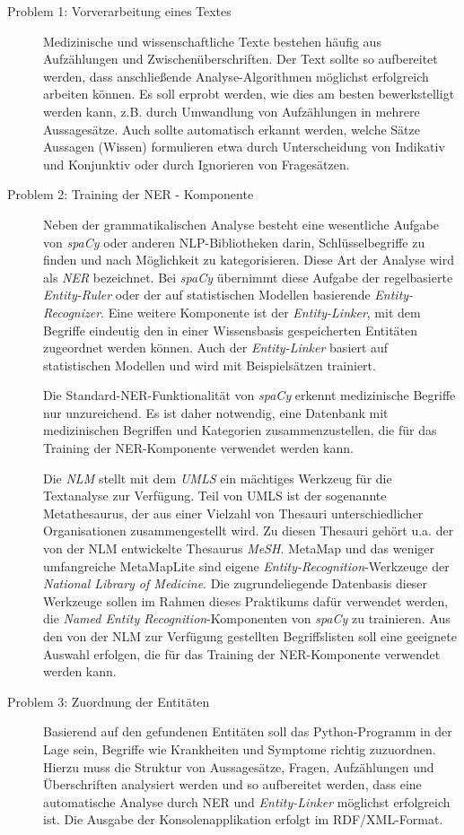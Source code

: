 \begin{description}

\item[Problem 1: Vorverarbeitung eines Textes] Medizinische und wissenschaftliche Texte bestehen häufig aus Aufzählungen und Zwischenüberschriften. Der Text sollte so aufbereitet werden, dass anschließende Analyse-Algorithmen möglichst erfolgreich arbeiten können. Es soll erprobt werden, wie dies am besten bewerkstelligt werden kann, z.B. durch Umwandlung von Aufzählungen in mehrere Aussagesätze. Auch sollte automatisch erkannt werden, welche Sätze Aussagen (Wissen) formulieren etwa durch Unterscheidung von Indikativ und Konjunktiv oder durch Ignorieren von Fragesätzen. 

\item[Problem 2: Training der NER - Komponente] Neben der grammatikalischen Analyse besteht eine wesentliche Aufgabe von \emph{spaCy} oder anderen NLP-Bibliotheken darin, Schlüsselbegriffe zu finden und nach Möglichkeit zu kategorisieren. Diese Art der Analyse wird als \emph{\ac{NER}} bezeichnet. Bei \emph{spaCy} übernimmt diese Aufgabe der regelbasierte \emph{Entity-Ruler} oder der auf statistischen Modellen basierende \emph{Entity-Recognizer}. Eine weitere Komponente ist der \emph{Entity-Linker}, mit dem Begriffe eindeutig den in einer Wissensbasis gespeicherten Entitäten zugeordnet werden können. Auch der \emph{Entity-Linker} basiert auf statistischen Modellen und wird mit Beispielsätzen trainiert.

Die Standard-NER-Funktionalität von \emph{spaCy} erkennt medizinische Begriffe nur unzureichend. Es ist daher notwendig, eine Datenbank mit medizinischen Begriffen und Kategorien zusammenzustellen, die für das Training der NER-Komponente verwendet werden kann.

Die \emph{\ac{NLM}} stellt mit dem \emph{\ac{UMLS}} ein mächtiges Werkzeug für die Textanalyse zur Verfügung. Teil von UMLS ist der sogenannte Metathesaurus, der aus einer Vielzahl von Thesauri unterschiedlicher Organisationen zusammengestellt wird. Zu diesen Thesauri gehört u.a. der von der NLM entwickelte Thesaurus \emph{\ac{MeSH}}. MetaMap und das weniger umfangreiche MetaMapLite sind eigene \emph{Entity-Recognition}-Werkzeuge der \emph{National Library of Medicine}. Die zugrundeliegende Datenbasis dieser Werkzeuge sollen im Rahmen dieses Praktikums dafür verwendet werden, die \emph{Named Entity Recognition}-Komponenten von \emph{spaCy} zu trainieren. Aus den von der NLM zur Verfügung gestellten Begriffslisten soll eine geeignete Auswahl erfolgen, die für das Training der NER-Komponente verwendet werden kann.

\item[Problem 3: Zuordnung der Entitäten]  Basierend auf den gefundenen Entitäten soll das Python-Programm in der Lage sein, Begriffe wie Krankheiten und Symptome richtig zuzuordnen. Hierzu muss die Struktur von Aussagesätze, Fragen, Aufzählungen und Überschriften analysiert werden und so aufbereitet werden, dass eine automatische Analyse durch NER und \emph{Entity-Linker} möglichst erfolgreich ist. Die Ausgabe der Konsolenapplikation erfolgt im RDF/XML-Format.

\end{description}
